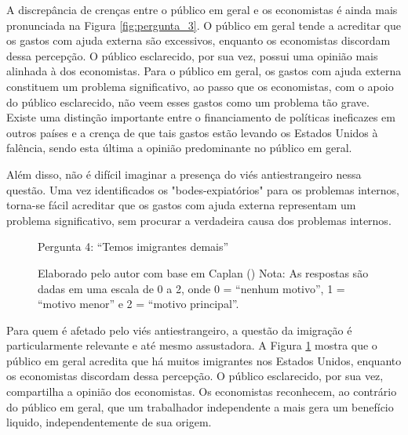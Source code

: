 A discrepância de crenças entre o público em geral e os economistas é ainda mais pronunciada na Figura \ref{fig:pergunta_3}. O público em geral tende a acreditar que os gastos com ajuda externa são excessivos, enquanto os economistas discordam dessa percepção. O público esclarecido, por sua vez, possui uma opinião mais alinhada à dos economistas. Para o público em geral, os gastos com ajuda externa constituem um problema significativo, ao passo que os economistas, com o apoio do público esclarecido, não veem esses gastos como um problema tão grave. Existe uma distinção importante entre o financiamento de políticas ineficazes em outros países e a crença de que tais gastos estão levando os Estados Unidos à falência, sendo esta última a opinião predominante no público em geral.

Além disso, não é difícil imaginar a presença do viés antiestrangeiro nessa questão. Uma vez identificados os "bodes-expiatórios" para os problemas internos, torna-se fácil acreditar que os gastos com ajuda externa representam um problema significativo, sem procurar a verdadeira causa dos problemas internos.

\begin{figure}[H]
    \centering
    \caption*{Pergunta 4: “Temos imigrantes demais”}
    \caption{Elaborado pelo autor com base em Caplan (\citeyear{The_Myth_of_the_Rational_Voter}) \newline
    Nota: As respostas são dadas em uma escala de 0 a 2, onde 0 = “nenhum motivo”, 1 = “motivo menor” e 2 = “motivo principal”.}
    \label{fig:pergunta_4}
\end{figure}

Para quem é afetado pelo viés antiestrangeiro, a questão da imigração é particularmente relevante e até mesmo assustadora. A Figura \ref{fig:pergunta_4} mostra que o público em geral acredita que há muitos imigrantes nos Estados Unidos, enquanto os economistas discordam dessa percepção. O público esclarecido, por sua vez, compartilha a opinião dos economistas. Os economistas reconhecem, ao contrário do público em geral, que um trabalhador independente a mais gera um benefício liquido, independentemente de sua origem. 

